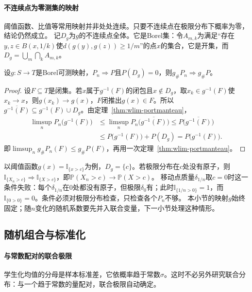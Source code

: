 \paragraph{不连续点为零测集的映射}
阈值函数、比值等常用映射并非处处连续。只要不连续点在极限分布下概率为零，结论仍然成立。
记$D_g$为$g$的不连续点全体。它是Borel集：令$A_{m,k}$为满足“存在$y,z\in B(x,1/k)$使$d(g(y),g(z))\geq1/m$”的点$x$的集合，它是开集，而$D_g=\bigcup_m\bigcap_kA_{m,k}$。

\begin{theorem}[不连续点为零测集的连续映射]
\label{thm:wlim-continuous-mapping-ae}
设$g:S\to T$是Borel可测映射，$P_n\Rightarrow P$且$P(D_g)=0$，则$g_\#P_n\Rightarrow g_\#P$。
\end{theorem}

\begin{proof}
设$F\subseteq T$是闭集。若$x$属于$g^{-1}(F)$的闭包且$x\notin D_g$，取$x_k\in g^{-1}(F)$使$x_k\to x$，则$g(x_k)\to g(x)$，$F$闭推出$g(x)\in F$。所以$\overline{g^{-1}(F)}\subseteq g^{-1}(F)\cup D_g$。由定理~\ref{thm:wlim-portmanteau}，
\[
  \begin{aligned}
  \limsup_nP_n\bigl(g^{-1}(F)\bigr)&\leq\limsup_nP_n\bigl(\overline{g^{-1}(F)}\bigr)\leq P\bigl(\overline{g^{-1}(F)}\bigr)\\
  &\leq P\bigl(g^{-1}(F)\bigr)+P(D_g)=P\bigl(g^{-1}(F)\bigr).
  \end{aligned}
\]
即$\limsup_ng_\#P_n(F)\leq g_\#P(F)$，再用一次定理~\ref{thm:wlim-portmanteau}。
\end{proof}

以阈值函数$g(x)=\mathbb I_{\{x>c\}}$为例，$D_g=\{c\}$。若极限分布在$c$处没有原子，则$\mathbb I_{\{X_n>c\}}\Rightarrow\mathbb I_{\{X>c\}}$，即$\mathbb P(X_n>c)\to\mathbb P(X>c)$。
移动点质量$\delta_{1/n}$取$c=0$时这一条件失败：每个$\delta_{1/n}$在$0$处都没有原子，但极限$\delta_0$有；此时$\mathbb I_{\{1/n>0\}}=1$，而$\mathbb I_{\{0>0\}}=0$。条件必须对极限分布检查，只检查各个$P_n$不够。
本小节的映射$g$始终固定；随$n$变化的随机系数要先并入联合变量，下一小节处理这种情形。

\subsection{随机组合与标准化}

\paragraph{与常数配对的联合极限}
学生化均值的分母是样本标准差，它依概率趋于常数$\sigma$。这时不必另外研究联合分布：与一个趋于常数的量配对，联合极限自动确定。

